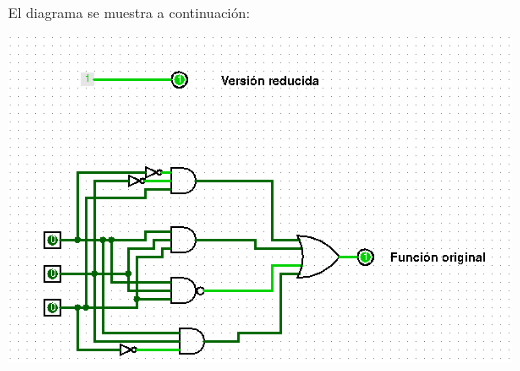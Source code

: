 \documentclass[answers]{exam}
\begin{document}
\begin{questions}
\begin{solution}
\begin{itemize}
            El diagrama se muestra a continuación:
            \begin{center}
              \includegraphics[scale=0.7]{ejercicio5.a}
            \end{center}


\end{itemize}
\end{solution}
\end{questions}
\end{document}
